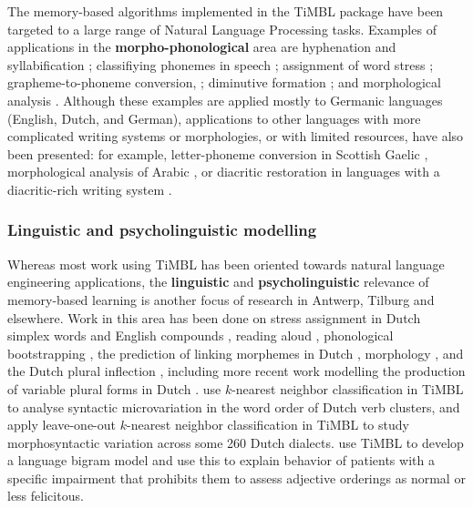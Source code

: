 \documentclass{book}
\begin{document}
The memory-based algorithms implemented in the TiMBL package have been
targeted to a large range of Natural Language Processing
tasks. Examples of applications in the {\bf morpho-phonological}
area are hyphenation and syllabification \cite{Daelemans+92b};
classifiying phonemes in speech \cite{Kocsor+00}; assignment of word
stress \cite{Daelemans+94}; grapheme-to-phoneme conversion,
\cite{VandenBosch+93,Daelemans+96,Canisius+06}; diminutive formation
\cite{Daelemans+98a}; and morphological analysis
\cite{VandenBosch+96,VandenBosch+99,Canisius+06}. Although these
examples are applied mostly to Germanic languages (English, Dutch, and
German), applications to other languages with more complicated writing
systems or morphologies, or with limited resources, have also been
presented: for example, letter-phoneme conversion in Scottish Gaelic
\cite{Wolters+97}, morphological analysis of Arabic \cite{Marsi+05},
or diacritic restoration in languages with a diacritic-rich writing
system \cite{Mihalcea02,DePauw+07}.

\subsubsection{Linguistic and psycholinguistic modelling}

Whereas most work using TiMBL has been oriented towards natural
language engineering applications, the {\bf linguistic} and {\bf psycholinguistic}
relevance of memory-based learning is another focus of research in
Antwerp, Tilburg and elsewhere. Work in this area has been done on
stress assignment in Dutch simplex words \cite{Daelemans+94,Gillis+00}
and English compounds \cite{Plag+07}, reading aloud
\cite{VandenBosch+00b}, phonological bootstrapping \cite{Durieux+00},
the prediction of linking morphemes in Dutch \cite{Krott+01},
morphology \cite{Eddington00,Eddington03}, and the Dutch plural
inflection \cite{Keuleers+07}, including more recent work modelling the
production of variable plural forms in Dutch \cite{Zee+21}.
 use $k$-nearest neighbor classification
in TiMBL to analyse syntactic microvariation in the word order of Dutch
verb clusters, and  apply leave-one-out
$k$-nearest neighbor classification in TiMBL to study morphosyntactic
variation across some 260 Dutch dialects.  use
TiMBL to develop a language bigram model and use this to explain
behavior of patients with a specific impairment that prohibits them to
assess adjective orderings as normal or less felicitous.
\end{document}
